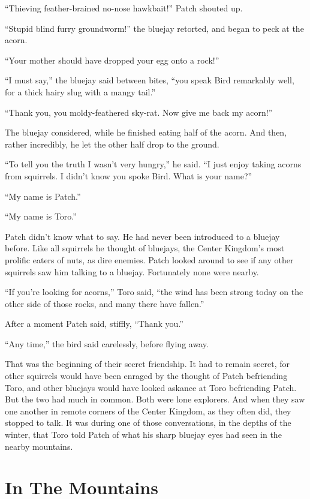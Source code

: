 \documentclass[ebook,oneside,openany,12pt]{memoir}
\begin{document}
“Thieving feather-brained no-nose hawkbait!” Patch shouted up.

“Stupid blind furry groundworm!” the bluejay retorted, and began to
peck at the acorn.

“Your mother should have dropped your egg onto a rock!”

“I must say,” the bluejay said between bites, “you speak Bird
remarkably well, for a thick hairy slug with a mangy tail.”

“Thank you, you moldy-feathered sky-rat. Now give me back my acorn!”

The bluejay considered, while he finished eating half of the
acorn. And then, rather incredibly, he let the other half drop to the
ground.

“To tell you the truth I wasn’t very hungry,” he said. “I just enjoy
taking acorns from squirrels. I didn’t know you spoke Bird. What is
your name?”

“My name is Patch.”

“My name is Toro.”

Patch didn’t know what to say. He had never been introduced to a
bluejay before. Like all squirrels he thought of bluejays, the Center
Kingdom’s most prolific eaters of nuts, as dire enemies. Patch looked
around to see if any other squirrels saw him talking to a
bluejay. Fortunately none were nearby.

“If you’re looking for acorns,” Toro said, “the wind has been strong
today on the other side of those rocks, and many there have fallen.”

After a moment Patch said, stiffly, “Thank you.”

“Any time,” the bird said carelessly, before flying away.

That was the beginning of their secret friendship. It had to remain
secret, for other squirrels would have been enraged by the thought of
Patch befriending Toro, and other bluejays would have looked askance
at Toro befriending Patch. But the two had much in common. Both were
lone explorers. And when they saw one another in remote corners of the
Center Kingdom, as they often did, they stopped to talk. It was during
one of those conversations, in the depths of the winter, that Toro
told Patch of what his sharp bluejay eyes had seen in the nearby
mountains.


\section{In The Mountains}
\end{document}
